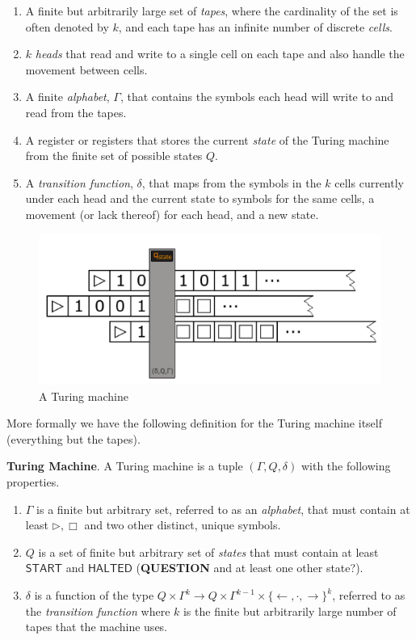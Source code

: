 \documentclass[usletter]{article}
\begin{document}
\begin{enumerate}
  \item A finite but arbitrarily large set of \textit{tapes},  where the cardinality of the set is often denoted by $k$, and each tape has an infinite number of discrete \textit{cells}.
  \item $k$ \textit{heads} that read and write to a single cell on each tape and also handle the movement between cells.
  \item A finite \textit{alphabet}, $\Gamma$, that contains the symbols each head will write to and read from the tapes.
  \item A register or registers that stores the current \textit{state} of the Turing machine from the finite set of possible states $Q$.
  \item A \textit{transition function}, $\delta$, that maps from the symbols in the $k$ cells currently under each head and the current state to symbols for the same cells, a movement (or lack thereof) for each head, and a new state.
\end{enumerate}

\begin{figure}
\begin{center}
\includegraphics[width=1\textwidth]{lectures/graphics/turing-machine}
\end{center}
\caption{A Turing machine}
\label{fig:turing-machine}
\end{figure}

More formally we have the following definition for the Turing machine itself (everything but the tapes).

\begin{definition}
  \textbf{Turing Machine}. A Turing machine is a tuple $(\Gamma, Q, \delta)$ with the following properties.
  \begin{enumerate}
    \item $\Gamma$ is a finite but arbitrary set, referred to as an \textit{alphabet}, that must contain at least $\rhd, \Box$ and two other distinct, unique symbols.
    \item $Q$ is a set of finite but arbitrary set of \textit{states} that must contain at least $\textsf{START}$ and $\textsf{HALTED}$ (\textbf{QUESTION} and at least one other state?).
    \item $\delta$ is a function of the type $Q \times \Gamma^{k} \rightarrow Q \times \Gamma^{k-1} \times \{\leftarrow, \cdot, \rightarrow\}^k$, referred to as the \textit{transition function} where $k$ is the finite but arbitrarily large number of tapes that the machine uses.
  \end{enumerate}
\end{definition}
\end{document}
